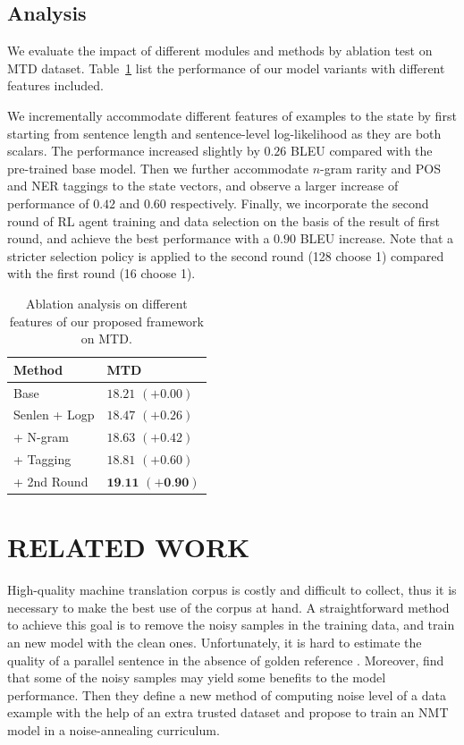 \documentclass[letterpaper]{article}
\begin{document}
\subsection{Analysis}
We evaluate the impact of different modules and methods by ablation test on MTD dataset. Table~\ref{tab:ablation} list the performance of our model variants with different features included.

We incrementally accommodate different features of examples to the state by first starting from sentence length and sentence-level log-likelihood as they are both scalars. The performance increased slightly by $0.26$ BLEU compared with the pre-trained base model. Then we further accommodate $n$-gram rarity and POS and NER taggings to the state vectors, and observe a larger increase of performance of $0.42$ and $0.60$ respectively. Finally, we incorporate the second round of RL agent training and data selection on the basis of the result of first round, and achieve the best performance with a $0.90$ BLEU increase. Note that a stricter selection policy is applied to the second round (128 choose 1) compared with the first round (16 choose 1).

\begin{table}[tb]
	\centering
    \begin{threeparttable}
      \caption{Ablation analysis on different features of our proposed framework on MTD.}
      \label{tab:ablation}
      \begin{tabular}{l|l}
        \toprule
        Method & MTD\\
        \midrule
        Base & $18.21$ $(+0.00)$\\
        Senlen + Logp &  $18.47$ $(+0.26)$\\
        + N-gram &  $18.63$ $(+0.42)$\\
        + Tagging &  $18.81$ $(+0.60)$\\
        + 2nd Round &  $\textbf{19.11}$  $(+\textbf{0.90})$\\
        \bottomrule
      \end{tabular}
    \end{threeparttable}
\end{table}

\section{RELATED WORK}
\label{sec:related}

High-quality machine translation corpus is costly and difficult to collect, thus it is necessary to make the best use of the corpus at hand. A straightforward method to achieve this goal is to remove the noisy samples in the training data, and train an new model with the clean ones. Unfortunately, it is hard to estimate the quality of a parallel sentence in the absence of golden reference \cite{fan2019bilingual}.  Moreover, \cite{wang2018denoising} find that some of the noisy samples may yield some benefits to the model performance. Then they define a new method of computing noise level of a data example with the help of an extra trusted dataset and propose to train an NMT model in a noise-annealing curriculum.
\end{document}
